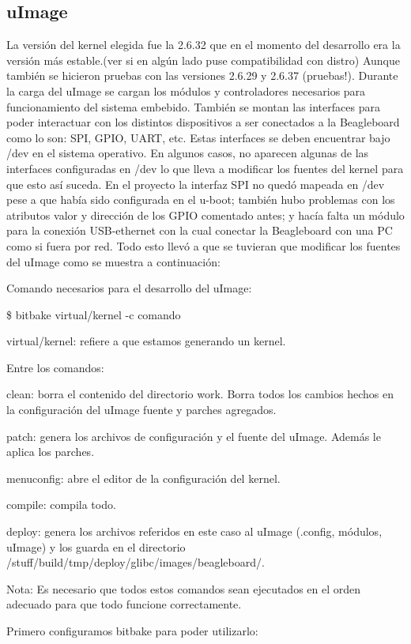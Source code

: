 \subsection{uImage}
La versión del kernel elegida fue la 2.6.32 que en el momento del desarrollo era la versión más estable.(ver si en algún lado puse compatibilidad con distro) Aunque también se hicieron pruebas con las versiones 2.6.29 y 2.6.37 (pruebas!).
Durante la carga del uImage se cargan los módulos y controladores necesarios para funcionamiento del sistema embebido. También se montan las interfaces para poder interactuar con los distintos dispositivos a ser conectados a la Beagleboard como lo son: SPI, GPIO, UART, etc. Estas interfaces se deben encuentrar bajo /dev en el sistema operativo. En algunos casos, no aparecen algunas de las interfaces configuradas en /dev lo que lleva a modificar los fuentes del kernel para que esto así suceda. En el proyecto la interfaz SPI no quedó mapeada en /dev pese a que había sido configurada en el u-boot; también hubo problemas con los atributos valor y dirección de los GPIO comentado antes; y hacía falta un módulo para la conexión USB-ethernet con la cual conectar la Beagleboard con una PC como si fuera por red. Todo esto llevó a que se tuvieran que modificar los fuentes del uImage como se muestra a continuación:
 
Comando necesarios para el desarrollo del uImage:

\$ bitbake virtual/kernel -c comando

virtual/kernel: refiere a que estamos generando un kernel.

Entre los comandos:

clean: borra el contenido del directorio work. Borra todos los cambios hechos en la configuración del uImage fuente y parches agregados.

patch: genera los archivos de configuración y el fuente del uImage. Además le aplica los parches.

menuconfig: abre el editor de la configuración del kernel.

compile: compila todo.

deploy: genera los archivos referidos en este caso al uImage (.config, módulos, uImage) y los guarda en el directorio /stuff/build/tmp/deploy/glibc/images/beagleboard/.

Nota: Es necesario que todos estos comandos sean ejecutados en el orden adecuado para que todo funcione correctamente.

Primero configuramos bitbake para poder utilizarlo:


